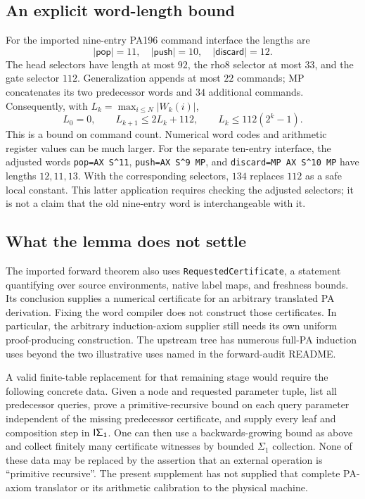 \subsection{An explicit word-length bound}
For the imported nine-entry PA196 command interface the lengths are
\[
 |\mathsf{pop}|=11,\quad |\mathsf{push}|=10,\quad
 |\mathsf{discard}|=12.
\]
The head selectors have length at most $92$, the rho8 selector at most $33$,
and the gate selector $112$. Generalization appends at most $22$ commands;
MP concatenates its two predecessor words and $34$ additional commands.
Consequently, with $L_k=\max_{i\le N}|W_k(i)|$,
\[
 L_0=0,\qquad L_{k+1}\le 2L_k+112,\qquad
 L_k\le112(2^k-1).
\]
This is a bound on command count. Numerical word codes and arithmetic
register values can be much larger. For the separate ten-entry interface,
the adjusted words \texttt{pop=AX S\string^11},
\texttt{push=AX S\string^9 MP}, and
\texttt{discard=MP AX S\string^10 MP} have lengths $12,11,13$.
With the corresponding selectors, $134$ replaces $112$ as a safe local
constant. This latter application requires checking the adjusted selectors;
it is not a claim that the old nine-entry word is interchangeable with it.

\subsection{What the lemma does not settle}
The imported forward theorem also uses \texttt{RequestedCertificate}, a
statement quantifying over source environments, native label maps, and
freshness bounds. Its conclusion supplies a numerical certificate for an
arbitrary translated PA derivation. Fixing the word compiler does not
construct those certificates. In particular, the arbitrary induction-axiom
supplier still needs its own uniform proof-producing construction.
The upstream tree has numerous full-PA induction uses beyond the two
illustrative uses named in the forward-audit README.

A valid finite-table replacement for that remaining stage would require
the following concrete data. Given a node and requested parameter tuple,
list all predecessor queries, prove a primitive-recursive bound on each
query parameter independent of the missing predecessor certificate, and
supply every leaf and composition step in $\mathsf{I\Sigma_1}$. One can then use a
backwards-growing bound as above and collect finitely many certificate
witnesses by bounded $\Sigma_1$ collection. None of these data may be
replaced by the assertion that an external operation is ``primitive
recursive''. The present supplement has not supplied that complete
PA-axiom translator or its arithmetic calibration to the physical machine.

